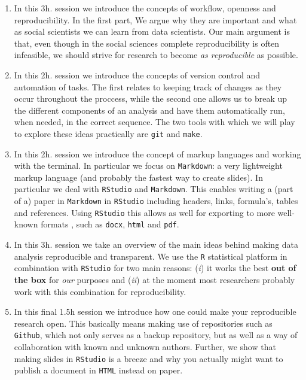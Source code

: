 \documentclass[11pt, a4paper]{article}
\begin{document}
\begin{enumerate}
\item In this 3h. session we introduce the concepts of workflow, openness and
    reproducibility. In the first part, We argue why they are important and
    what as social scientists we can learn from data scientists. Our main
    argument is that, even though in the social sciences complete
    reproducibility is often infeasible, we should strive for research to
    become \emph{as reproducible} as possible.
\item In this 2h. session we introduce the concepts of version control and
    automation of tasks. The first relates to keeping track of changes as they
    occur throughout the proccess, while the second one allows us to break up
    the different components of an analysis and have them automatically run,
    when needed, in the correct sequence. The two tools with which we will
    play to explore these ideas practically are \texttt{git} and
    \texttt{make}.
\item In this 2h. session we introduce the concept of markup languages and
    working with the terminal. In particular we focus on \texttt{Markdown}: a
    very lightweight markup language (and probably the fastest way to create
    slides). In particular we deal with \texttt{RStudio} and
    \texttt{Markdown}. This enables writing a (part of a) paper in
    \texttt{Markdown} in \texttt{RStudio} including headers, links, formula's,
    tables and references. Using \texttt{RStudio} this allows as well for
    exporting to more well-known formats , such as \texttt{docx},
    \texttt{html} and \texttt{pdf}.
\item In this 3h. session we take an overview of the main ideas behind making
    data analysis reproducible and transparent. We use the \texttt{R}
    statistical platform in combination with \texttt{RStudio} for two main
    reasons: (\emph{i}) it works the best \textbf{out of the box} for
    \emph{our} purposes and (\emph{ii}) at the moment most researchers
    probably work with this combination for reproducibility.
\item In this final 1.5h session we introduce how one could make your
    reproducible research open. This basically means making use of
    repositories such as \texttt{Github}, which not only serves as a backup
    repository, but as well as a way of collaboration with known and unknown
    authors. Further, we show that making slides in \texttt{RStudio} is a
    breeze and why you actually might want to publish a document in
    \texttt{HTML} instead on paper.
\end{enumerate}
\end{document}
